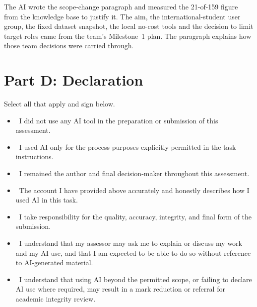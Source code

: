 \documentclass[manuscript,screen,nonacm]{acmart}
\begin{document}
\vspace{0.5em}
\noindent The AI wrote the scope-change paragraph and measured the 21-of-159 figure from the knowledge base to justify it. The aim, the international-student user group, the fixed dataset snapshot, the local no-cost tools and the decision to limit target roles came from the team's Milestone~1 plan. The paragraph explains how those team decisions were carried through.

\section*{Part D: Declaration}

\noindent Select all that apply and sign below.

\begin{itemize}
\item \noindent\CheckBox[name=declNotUsed2,bordercolor={0 0 0},width=1.2ex,height=1.2ex]{}~I did not use any AI tool in the preparation or submission of this assessment. \\[0.8em]
\item \noindent\CheckBox[name=declUsePermitted,bordercolor={0 0 0},width=1.2ex,height=1.2ex]{}~I used AI only for the process purposes explicitly permitted in the task instructions.\\[0.8em]
\item \noindent\CheckBox[name=declRemainedAuthor,bordercolor={0 0 0},width=1.2ex,height=1.2ex]{}~I remained the author and final decision-maker throughout this assessment.\\[0.8em]
\item \noindent\CheckBox[name=declBeforeAfter,bordercolor={0 0 0},width=1.2ex,height=1.2ex]{}~The account I have provided above accurately and honestly describes how I used AI in this task.\\[0.8em]
\item \noindent\CheckBox[name=declResponsibility,bordercolor={0 0 0},width=1.2ex,height=1.2ex]{}~I take responsibility for the quality, accuracy, integrity, and final form of the submission.\\[0.8em]
\item \noindent\CheckBox[name=declInterview,bordercolor={0 0 0},width=1.2ex,height=1.2ex]{}~I understand that my assessor may ask me to explain or discuss my work and my AI use, and that I am expected to be able to do so without reference to AI-generated material.\\[0.8em]
\item \noindent\CheckBox[name=declIntegrity,bordercolor={0 0 0},width=1.2ex,height=1.2ex]{}~I understand that using AI beyond the permitted scope, or failing to declare AI use where required, may result in a mark reduction or referral for academic integrity review.
\end{itemize}
\end{document}
